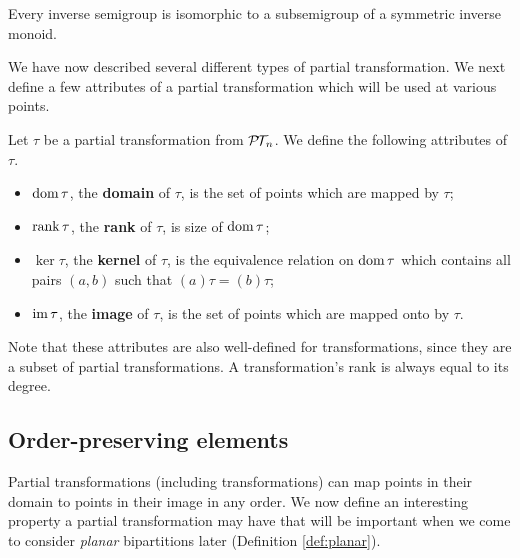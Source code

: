 \begin{theorem}
  \label{thm:wagner-preston}
  Every inverse semigroup is isomorphic to a subsemigroup of a symmetric inverse
  monoid.
\end{theorem}

We have now described several different types of partial transformation.  We
next define a few attributes of a partial transformation which will be used at
various points.

\begin{definition}
  Let $\tau$ be a partial transformation from $\mathcal{P\!T\!}_n$.  We define the following
  attributes of $\tau$.
  \begin{itemize}
  \item $\operatorname{dom} \tau$, the \textbf{domain} of $\tau$, is the set of points which
    are mapped by $\tau$;
  \item $\operatorname{rank} \tau$, the \textbf{rank} of $\tau$, is size of $\operatorname{dom} \tau$;
  \item $\ker \tau$, the \textbf{kernel} of $\tau$, is the equivalence relation
    on $\operatorname{dom} \tau$ which contains all pairs $(a,b)$ such that
    $(a)\tau = (b)\tau$;
  \item $\operatorname{im} \tau$, the \textbf{image} of $\tau$, is the set of points which are
    mapped onto by $\tau$.
  \end{itemize}
\end{definition}

Note that these attributes are also well-defined for transformations, since they
are a subset of partial transformations.  A transformation's rank is always
equal to its degree.

\subsection{Order-preserving elements}
\label{sec:order-preserving}

Partial transformations (including transformations) can map points in their
domain to points in their image in any order.  We now define an interesting
property a partial transformation may have that will be important when we come
to consider \textit{planar} bipartitions later (Definition \ref{def:planar}).

